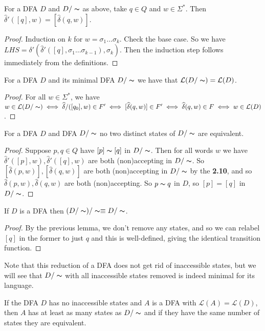 \documentclass[10pt,a4paper]{article}
\begin{document}
\begin{lemma}
For a DFA $D$ and $D/\thicksim$ as above, take $q \in Q$ and $w \in \Sigma^{\ast}$. Then $\hat{\delta}'([q],w) = [\hat{\delta}(q,w)]$.
\end{lemma}
\begin{proof}
Induction on $k$ for $w = \sigma_1 \ldots \sigma_k$. Check the base case. So we have $LHS = \delta'(\hat{\delta}'([q], \sigma_1\ldots\sigma_{k-1}), \sigma_k)$. Then the induction step follows immediately from the definitions.
\end{proof}
\begin{theorem}
For a DFA $D$ and its minimal DFA $D/\thicksim$ we have that $\mathcal{L}(D/\thicksim) = \mathcal{L}(D)$.
\end{theorem}
\begin{proof}
For all $w \in \Sigma^{\ast}$, we have $w \in \mathcal{L}(D/\thicksim) \iff \hat{\delta}/([q_0],w) \in F' \iff [\hat{\delta}(q,w)] \in F' \iff \hat{\delta}(q,w) \in F \iff w \in \mathcal{L}(D)$.
\end{proof}
\begin{lemma}
For a DFA $D$ and DFA $D/\thicksim$ no two distinct states of $D/\thicksim$ are equivalent.
\end{lemma}
\begin{proof}
Suppose $p, q \in Q$ have $[p] \thicksim [q]$ in $D/\thicksim$. Then for all words $w$ we have $\hat{\delta}'([p],w), \hat{\delta}'([q],w)$ are both (non)accepting in $D/\thicksim$. So $[\hat{\delta}(p,w)], [\hat{\delta}(q,w)]$ are both (non)accepting in $D/\thicksim$ by the \textbf{2.10}, and so $\hat{\delta}(p,w),\hat{\delta}(q,w)$ are both (non)accepting. So $p \thicksim q$ in $D$, so $[p]=[q]$ in $D/\thicksim$.
\end{proof}
\begin{corollary}
If $D$ is a DFA then $(D/\thicksim)/\thicksim \equiv D/\thicksim$.
\end{corollary}
\begin{proof}
By the previous lemma, we don't remove any states, and so we can relabel $[q]$ in the former to just $q$ and this is well-defined, giving the identical transition function.
\end{proof}
Note that this reduction of a DFA does not get rid of inaccessible states, but we will see that $D/\thicksim$ with all inaccessible states removed is indeed minimal for its language.
\begin{theorem}
If the DFA $D$ has no inaccessible states and $A$ is a DFA with $\mathcal{L}(A) = \mathcal{L}(D)$, then $A$ has at least as many states as $D/\thicksim$ and if they have the same number of states they are equivalent.
\end{theorem}
\end{document}
